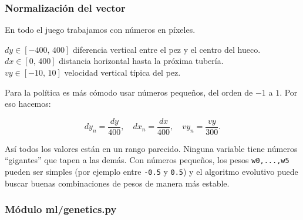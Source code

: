 \documentclass[
	11pt, %
]{beamer}
\begin{document}

\begin{frame}
\frametitle{Normalización del vector}

En todo el juego trabajamos con números en píxeles.

\vspace{6pt}

$dy \in [-400,\, 400]$ \; diferencia vertical entre el pez y el centro del hueco.\\
$dx \in [0,\, 400]$ \; distancia horizontal hasta la próxima tubería.\\
$vy \in [-10,\, 10]$ \; velocidad vertical típica del pez.\\

\vspace{6pt}

Para la política es más cómodo usar números pequeños, del orden de $-1$ a $1$.
Por eso hacemos:

\[
dy_n = \frac{dy}{400}, \quad
dx_n = \frac{dx}{400}, \quad
vy_n = \frac{vy}{300}.
\]

Así todos los valores están en un rango parecido.
Ninguna variable tiene números “gigantes” que tapen a las demás.
Con números pequeños, los pesos \texttt{w0,...,w5} pueden ser simples
(por ejemplo entre \texttt{-0.5} y \texttt{0.5}) y el algoritmo evolutivo puede buscar buenas combinaciones de pesos
de manera más estable.

\end{frame}





\subsubsection{Módulo ml/genetics.py}

\end{document}
